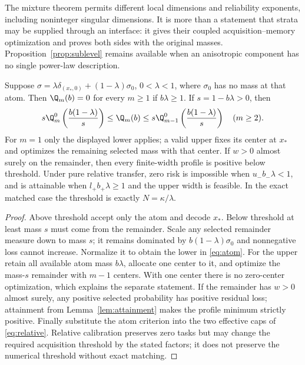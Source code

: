 The mixture theorem permits different local dimensions and reliability exponents, including noninteger singular dimensions. It is more than a statement that strata may be supplied through an interface: it gives their coupled acquisition--memory optimization and proves both sides with the original masses. Proposition~\ref{prop:sublevel} remains available when an anisotropic component has no single power-law description.

\begin{proposition}\label{prop:atom}
Suppose $\sigma=\lambda\delta_{(x_*,0)}+(1-\lambda)\sigma_0$, $0<\lambda<1$, where $\sigma_0$ has no mass at that atom. Then $\Q_m(b)=0$ for every $m\ge1$ if $b\lambda\ge1$. If $s=1-b\lambda>0$, then
\begin{equation}\label{eq:atom}
 s\Q_m^0\left(\frac{b(1-\lambda)}s\right)
 \le\Q_m(b)\le
 s\Q_{m-1}^0\left(\frac{b(1-\lambda)}s\right)\quad(m\ge2).
\end{equation}
For $m=1$ only the displayed lower applies; a valid upper fixes its center at $x_*$ and optimizes the remaining selected mass with that center. If $w>0$ almost surely on the remainder, then every finite-width profile is positive below threshold. Under pure relative transfer, zero risk is impossible when $u_-b_-\lambda<1$, and is attainable when $l_+b_+\lambda\ge1$ and the upper width is feasible. In the exact matched case the threshold is exactly $N=\kappa/\lambda$.
\end{proposition}
\begin{proof}
Above threshold accept only the atom and decode $x_*$. Below threshold at least mass $s$ must come from the remainder. Scale any selected remainder measure down to mass $s$; it remains dominated by $b(1-\lambda)\sigma_0$ and nonnegative loss cannot increase. Normalize it to obtain the lower in \eqref{eq:atom}. For the upper retain all available atom mass $b\lambda$, allocate one center to it, and optimize the mass-$s$ remainder with $m-1$ centers. With one center there is no zero-center optimization, which explains the separate statement. If the remainder has $w>0$ almost surely, any positive selected probability has positive residual loss; attainment from Lemma~\ref{lem:attainment} makes the profile minimum strictly positive. Finally substitute the atom criterion into the two effective caps of \eqref{eq:relative}. Relative calibration preserves zero tasks but may change the required acquisition threshold by the stated factors; it does not preserve the numerical threshold without exact matching.
\end{proof}

